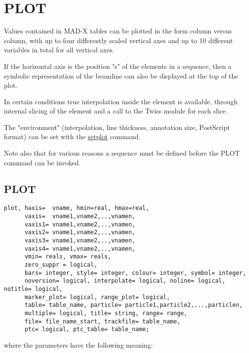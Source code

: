 
\chapter{PLOT}

Values contained in MAD-X tables can be plotted in the form column
versus column, with up to four differently scaled vertical axes and up
to 10 different variables in total for all vertical axes.

If the horizontal axis is the position "s" of the elements
in a sequence, then a symbolic representation of the beamline can also
be displayed at the top of the plot. 

In certain conditions true interpolation inside the element is
available, through internal slicing of the element and a call to the
Twiss module for each slice. 

The "environment" (interpolation, line thickness, annotation size,
PostScript format) can be set with the \hyperlink{setplot}{setplot}
command.   

Note also that for various reasons a sequence must be defined before the 
PLOT command can be invoked. 

\section{PLOT}	
\begin{verbatim}
plot, haxis=  vname, hmin=real, hmax=real, 
      vaxis=  vname1,vname2,..,vnamen,
      vaxis1= vname1,vname2,..,vnamen, 
      vaxis2= vname1,vname2,..,vnamen,
      vaxis3= vname1,vname2,..,vnamen, 
      vaxis4= vname1,vname2,..,vnamen,
      vmin= reals, vmax= reals, 
      zero_suppr = logical,
      bars= integer, style= integer, colour= integer, symbol= integer, 
      noversion= logical, interpolate= logical, noline= logical, notitle= logical, 
      marker_plot= logical, range_plot= logical, 
      table= table_name, particle= particle1,particle2,...,particlen,
      multiple= logical, title= string, range= range, 
      file= file_name_start, trackfile= table_name,
      ptc= logical, ptc_table= table_name; 
\end{verbatim} 

where the parameters have the following meaning: 

